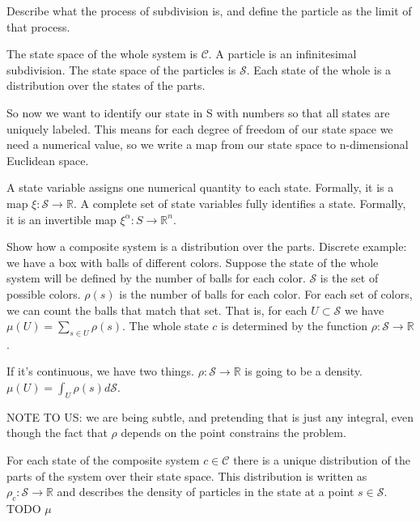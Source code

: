 \documentclass{article}
\begin{document}
Describe what the process of subdivision is, and define the particle as the limit of that process.

\begin{defn}
	The state space of the whole system is $\mathcal{C}$. A particle is an infinitesimal subdivision. The state space of the particles is $\mathcal{S}$. Each state of the whole is a distribution over the states of the parts.
\end{defn}


So now we want to identify our state in S with numbers so that all states are uniquely labeled. This means for each degree of freedom of our state space we need a numerical value, so we write a map from our state space to n-dimensional Euclidean space. 

\begin{defn}
	A state variable assigns one numerical quantity to each state. Formally, it is a map $\xi : \mathcal{S} \to \mathbb{R}$. A complete set of state variables fully identifies a state. Formally, it is an invertible  map $\xi^\alpha : S \rightarrow \mathbb{R}^n $.
\end{defn}

Show how a composite system is a distribution over the parts. Discrete example: we have a box with balls of different colors. Suppose the state of the whole system will be defined by the number of balls for each color. $\mathcal{S}$ is the set of possible colors. $\rho(s)$ is the number of balls for each color. For each set of colors, we can count the balls that match that set. That is, for each $U \subset \mathcal{S}$ we have $\mu(U) = \sum_{s \in U} \rho(s)$. The whole state $c$ is determined by the function $\rho : \mathcal{S} \to \mathbb{R}$.

If it's continuous, we have two things. $\rho : \mathcal{S} \to \mathbb{R}$ is going to be a density. $\mu(U) = \int_{U} \rho(s) d\mathcal{S}$.

NOTE TO US: we are being subtle, and pretending that is just any integral, even though the fact that $\rho$ depends on the point constrains the problem.

\begin{defn}
	For each state of the composite system $c \in \mathcal{C}$ there is a unique distribution of the parts of the system over their state space. This distribution is written as $\rho_c: \mathcal{S} \rightarrow \mathbb{R}$ and describes the density of particles in the state at a point $s \in \mathcal{S}$. TODO $\mu$
\end{defn}
\end{document}
